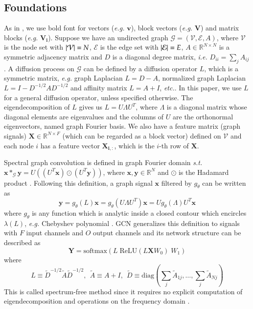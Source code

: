 \documentclass{article}
\newcommand\ie{\textit{i.e.}}
\newcommand\eg{\textit{e.g.}}
\newcommand\st{\textit{s.t.}}
\newcommand\etc{\textit{etc.}}
\begin{document}
\subsection{Foundations}
As in \cite{frommer2017block}, we use bold font for vectors (\eg{} $\bm{v}$), block vectors (\eg{} $\bm{V}$) and matrix blocks (\eg{} $\bm{V_i}$). Suppose we have an undirected graph $\mathcal{G}=(\mathcal{V},\mathcal{E}, A)$, where $\mathcal{V}$ is the node set with $\abs{\mathcal{V}}=N$, $\mathcal{E}$ is the edge set with $\abs{\mathcal{E}}=E$, $A \in \mathbb{R}^{N\times N}$ is a symmetric adjacency matrix and $D$ is a diagonal degree matrix, \ie{} $D_{ii} = \sum_j A_{ij}$. A diffusion process \cite{coifman2006diffusion, coifman2006diffusionmaps} on $\mathcal{G}$ can be defined by a diffusion operator $L$, which is a symmetric matrix, \eg{} graph Laplacian $L=D-A$, normalized graph Laplacian $L=I-D^{-1/2} A D^{-1/2}$ and affinity matrix $L = A + I$, \etc{}. In this paper, we use $L$ for a general diffusion operator, unless specified otherwise. The eigendecomposition of $L$ gives us $L=U \Lambda U^T$, where $\Lambda$ is a diagonal matrix whose diagonal elements are eigenvalues and the columns of $U$ are the orthonormal eigenvectors, named graph Fourier basis. We also have a feature matrix (graph signals) $\bm{X} \in \mathbb{R}^{N\times F}$ (which can be regarded as a block vector)
defined on $\mathcal{V}$ and each node $i$ has a feature vector $\bm{X_{i,:}}$, which is the $i$-th row of $\bm{X}$.

Spectral graph convolution is defined in graph Fourier domain \st{} $\bm{x} *_{\mathcal{G}} \bm{y} = U((U^T \bm{x}) \odot (U^T\bm{y}))$, where $\bm{x}, \bm{y} \in \mathbb{R}^N$ and $\odot$ is the Hadamard product \cite{defferrard2016fast}. Following this definition, a graph signal $\bm{x}$ filtered by $g_\theta$ can be written as
\begin{equation}\label{def}
    \bm{y} = g_\theta(L)\bm{x} = g_\theta(U \Lambda U^T) \bm{x} = U g_\theta(\Lambda) U^T \bm{x}
\end{equation}
where $g_\theta$ is any function which is analytic inside a closed contour which encircles $\lambda(L)$, \eg{} Chebyshev polynomial \cite{defferrard2016fast}. GCN generalizes this definition to signals with $F$ input channels and $O$ output channels and its network structure can be described as
\begin{equation}
    \label{eq0}
   \bm{Y} = \text{softmax} ({L} \; \text{ReLU} ( L \bm{X} W_0 ) \; W_1 )
\end{equation}
where
\begin{equation} \label{eq01}
L \equiv \tilde{D}^{-1/2} \tilde{A} \tilde{D}^{-1/2}, \ \ \tilde{A} \equiv A+I, \ \
\tilde{D}\equiv \mbox{diag}(\textstyle{\sum_j} \tilde{A}_{1j}, \ldots, \sum_j \tilde{A}_{Nj})
\end{equation}
This is called spectrum-free method \cite{bronstein2016geometric} since it requires no explicit computation of eigendecomposition and operations on the frequency domain \cite{zhang2018graph}.
\end{document}
